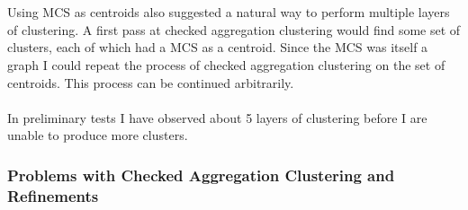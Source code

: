 \documentclass[DIV=calc, paper=a4, fontsize=12pt, twocolumn]{scrartcl}	 %
\begin{document}
\\\\
Using MCS as centroids also suggested a natural way to perform multiple layers of clustering. A first pass at checked aggregation clustering would find some set of clusters, each of which had a MCS as a centroid. Since the MCS was itself a graph I could repeat the process of checked aggregation clustering on the set of centroids. This process can be continued arbitrarily.
\\\\
In preliminary tests I have observed about 5 layers of clustering before I are unable to produce more clusters.

\subsubsection*{Problems with Checked Aggregation Clustering and Refinements}
\end{document}
